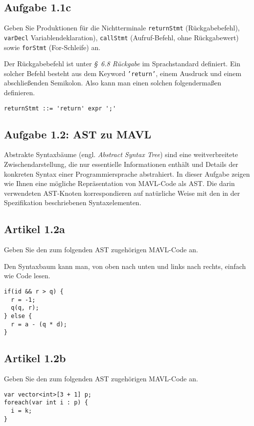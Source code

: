 \documentclass[
  ngerman,
  DIV=14
]{scrartcl}
\begin{document}
\subsection*{Aufgabe 1.1c}

Geben Sie Produktionen für die Nichtterminale \texttt{returnStmt} (Rückgabebefehl), \texttt{varDecl} Variablendeklaration), \texttt{callStmt} (Aufruf-Befehl, ohne Rückgabewert) sowie \texttt{forStmt} (For-Schleife) an.

\bigskip\noindent
Der Rückgabebefehl ist unter \emph{§~6.8 Rückgabe} im Sprachstandard definiert. Ein solcher Befehl besteht aus dem Keyword \texttt{'return'}, einem Ausdruck und einem abschließenden Semikolon. Also kann man einen solchen folgendermaßen definieren.
\begin{lstlisting}
returnStmt ::= 'return' expr ';'
\end{lstlisting}


\subsection*{Aufgabe 1.2: AST zu MAVL}
Abstrakte Syntaxbäume (engl. \emph{Abstract Syntax Tree}) sind eine weitverbreitete Zwischendarstellung, die nur essentielle Informationen enthält und Details der konkreten Syntax einer Programmiersprache abstrahiert. In dieser Aufgabe zeigen wie Ihnen eine mögliche Repräsentation von MAVL-Code als AST. Die darin verwendeten AST-Knoten korrespondieren auf natürliche Weise mit den in der Spezifikation beschriebenen Syntaxelementen. 

\subsection*{Artikel 1.2a}
Geben Sie den zum folgenden AST zugehörigen MAVL-Code an.  

\bigskip\noindent
Den Syntaxbaum kann man, von oben nach unten und links nach rechts, einfach wie Code lesen.
\begin{lstlisting}
if(id && r > q) {
  r = -1;
  q(q, r);
} else {
  r = a - (q * d);
}
\end{lstlisting}


\subsection*{Artikel 1.2b}
Geben Sie den zum folgenden AST zugehörigen MAVL-Code an.  

\bigskip\noindent
\begin{lstlisting}
var vector<int>[3 + 1] p;
foreach(var int i : p) {
  i = k;
}  
\end{lstlisting}
\end{document}
